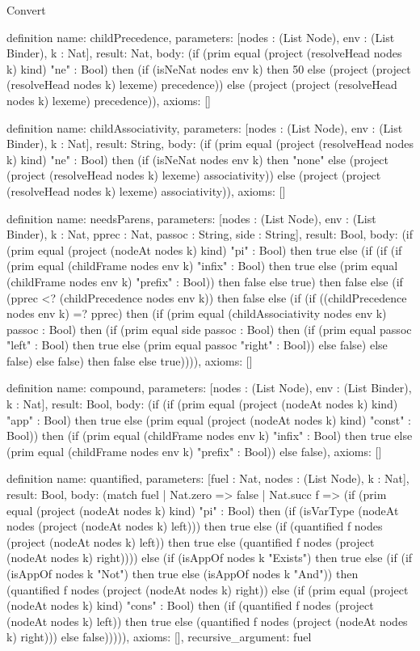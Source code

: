 \begin{lexlean}{Convert}
\begin{semanticmodule}
definition{
  name: childPrecedence,
  parameters: [nodes : (List Node), env : (List Binder), k : Nat],
  result: Nat,
  body: (if (prim equal (project (resolveHead nodes k) kind) "ne" : Bool) then (if (isNeNat nodes env k) then 50 else (project (project (resolveHead nodes k) lexeme) precedence)) else (project (project (resolveHead nodes k) lexeme) precedence)),
  axioms: []
}

definition{
  name: childAssociativity,
  parameters: [nodes : (List Node), env : (List Binder), k : Nat],
  result: String,
  body: (if (prim equal (project (resolveHead nodes k) kind) "ne" : Bool) then (if (isNeNat nodes env k) then "none" else (project (project (resolveHead nodes k) lexeme) associativity)) else (project (project (resolveHead nodes k) lexeme) associativity)),
  axioms: []
}

definition{
  name: needsParens,
  parameters: [nodes : (List Node), env : (List Binder), k : Nat, pprec : Nat, passoc : String, side : String],
  result: Bool,
  body: (if (prim equal (project (nodeAt nodes k) kind) "pi" : Bool) then true else (if (if (if (prim equal (childFrame nodes env k) "infix" : Bool) then true else (prim equal (childFrame nodes env k) "prefix" : Bool)) then false else true) then false else (if (pprec <? (childPrecedence nodes env k)) then false else (if (if ((childPrecedence nodes env k) =? pprec) then (if (prim equal (childAssociativity nodes env k) passoc : Bool) then (if (prim equal side passoc : Bool) then (if (prim equal passoc "left" : Bool) then true else (prim equal passoc "right" : Bool)) else false) else false) else false) then false else true)))),
  axioms: []
}

definition{
  name: compound,
  parameters: [nodes : (List Node), env : (List Binder), k : Nat],
  result: Bool,
  body: (if (if (prim equal (project (nodeAt nodes k) kind) "app" : Bool) then true else (prim equal (project (nodeAt nodes k) kind) "const" : Bool)) then (if (prim equal (childFrame nodes env k) "infix" : Bool) then true else (prim equal (childFrame nodes env k) "prefix" : Bool)) else false),
  axioms: []
}

definition{
  name: quantified,
  parameters: [fuel : Nat, nodes : (List Node), k : Nat],
  result: Bool,
  body: (match fuel
    | Nat.zero => false
    | Nat.succ f => (if (prim equal (project (nodeAt nodes k) kind) "pi" : Bool) then (if (isVarType (nodeAt nodes (project (nodeAt nodes k) left))) then true else (if (quantified f nodes (project (nodeAt nodes k) left)) then true else (quantified f nodes (project (nodeAt nodes k) right)))) else (if (isAppOf nodes k "Exists") then true else (if (if (isAppOf nodes k "Not") then true else (isAppOf nodes k "And")) then (quantified f nodes (project (nodeAt nodes k) right)) else (if (prim equal (project (nodeAt nodes k) kind) "cons" : Bool) then (if (quantified f nodes (project (nodeAt nodes k) left)) then true else (quantified f nodes (project (nodeAt nodes k) right))) else false))))),
  axioms: [],
  recursive_argument: fuel
}


\end{semanticmodule}
\end{lexlean}
